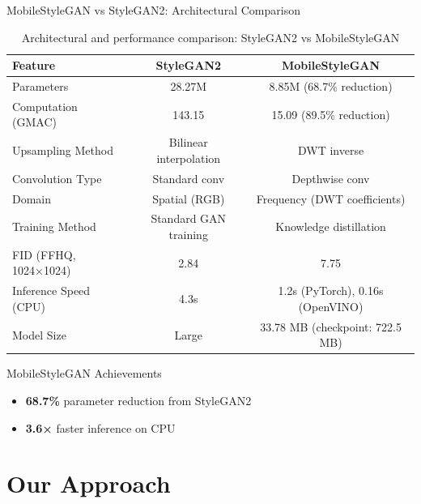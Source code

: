 \documentclass[aspectratio=169,xcolor=dvipsnames]{beamer}
\begin{document}
\begin{frame}{MobileStyleGAN vs StyleGAN2: Architectural Comparison}
    \begin{table}
        \centering
        \footnotesize
        \begin{tabular}{l c c}
            \toprule
            \textbf{Feature} & \textbf{StyleGAN2} & \textbf{MobileStyleGAN} \\
            \midrule
            Parameters & 28.27M & 8.85M (68.7\% reduction) \\
            Computation (GMAC) & 143.15 & 15.09 (89.5\% reduction) \\
            Upsampling Method & Bilinear interpolation & DWT inverse \\
            Convolution Type & Standard conv & Depthwise conv \\
            Domain & Spatial (RGB) & Frequency (DWT coefficients) \\
            Training Method & Standard GAN training & Knowledge distillation \\
            FID (FFHQ, 1024×1024) & 2.84 & 7.75 \\
            Inference Speed (CPU) & 4.3s & 1.2s (PyTorch), 0.16s (OpenVINO) \\
            Model Size & Large & 33.78 MB (checkpoint: 722.5 MB) \\
            \bottomrule
        \end{tabular}
        \caption{Architectural and performance comparison: StyleGAN2 vs MobileStyleGAN}
    \end{table}
    
    \vspace{0.3cm}
    
    \begin{block}{MobileStyleGAN Achievements}
        \begin{itemize}
            \item \textbf{68.7\%} parameter reduction from StyleGAN2
            \item \textbf{3.6×} faster inference on CPU
        \end{itemize}
    \end{block}
\end{frame}

\section{Our Approach}
\end{document}
